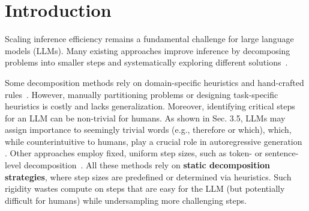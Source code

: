 
\section{Introduction}

Scaling inference efficiency remains a fundamental challenge for large language models (LLMs). Many existing approaches improve inference by decomposing problems into smaller steps and systematically exploring different solutions~\citep{feng2023alphazero, zeng2024scaling, wu2024inferencescalinglawsempirical, nori2024medprompto1explorationruntime, snell2024scaling, brown2024large, gandhi2024stream, lee2025evolvingdeeperllmthinking, light2024strategist, anonymous2025planning}. 

Some decomposition methods rely on domain-specific heuristics and hand-crafted rules~\citep{yao2024tree, zelikman2023parsel, zhou2022least}. However, manually partitioning problems or designing task-specific heuristics is costly and lacks generalization. 
Moreover, identifying critical steps for an LLM can be non-trivial for humans. As shown in Sec. 3.5, LLMs may assign importance to seemingly trivial words (e.g., therefore or which), which, while counterintuitive to humans, play a crucial role in autoregressive generation \citep{lin2025criticaltokens}.
Other approaches employ fixed, uniform step sizes, such as token- or sentence-level decomposition~\citep{feng2023alphazero, guo2025deepseek}. All these methods rely on \textbf{static decomposition strategies}, where step sizes are predefined or determined via heuristics. Such rigidity wastes compute on steps that are easy for the LLM (but potentially difficult for humans) while undersampling more challenging steps.

